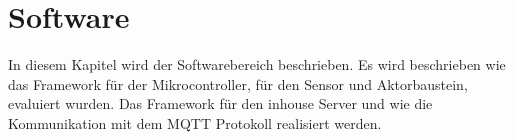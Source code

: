 \section{Software}
In diesem Kapitel wird der Softwarebereich beschrieben. Es wird beschrieben wie das Framework für der Mikrocontroller, für den Sensor und Aktorbaustein, evaluiert wurden. Das Framework für den inhouse Server und wie die Kommunikation mit dem MQTT Protokoll realisiert werden.









